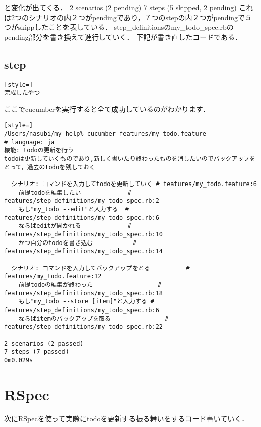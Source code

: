 と変化が出てくる．
2 scenarios (2 pending)
7 steps (5 skipped, 2 pending)
これは2つのシナリオの内２つがpendingであり，７つのstepの内２つがpendingで５つがskippしたことを表している．
step\_definitionsのmy\_todo\_spec.rbのpending部分を書き換えて進行していく．
下記が書き直したコードである．

\subsection{step}\begin{lstlisting}[style=]
完成したやつ
\end{lstlisting}
ここでcucumberを実行すると全て成功しているのがわかります．
\begin{lstlisting}[style=]
/Users/nasubi/my_help% cucumber features/my_todo.feature              
# language: ja
機能: todoの更新を行う
todoは更新していくものであり,新しく書いたり終わったものを消したいのでバックアップをとって，過去のtodoを残しておく

  シナリオ: コマンドを入力してtodoを更新していく # features/my_todo.feature:6
    前提todoを編集したい             # features/step_definitions/my_todo_spec.rb:2
    もし"my_todo --edit"と入力する  # features/step_definitions/my_todo_spec.rb:6
    ならばeditが開かれる             # features/step_definitions/my_todo_spec.rb:10
    かつ自分のtodoを書き込む           # features/step_definitions/my_todo_spec.rb:14

  シナリオ: コマンドを入力してバックアップをとる          # features/my_todo.feature:12
    前提todoの編集が終わった                  # features/step_definitions/my_todo_spec.rb:18
    もし"my_todo --store [item]"と入力する # features/step_definitions/my_todo_spec.rb:6
    ならばitemのバックアップを取る               # features/step_definitions/my_todo_spec.rb:22

2 scenarios (2 passed)
7 steps (7 passed)
0m0.029s

\end{lstlisting}
\section{RSpec}
次にRSpecを使って実際にtodoを更新する振る舞いをするコード書いていく．


